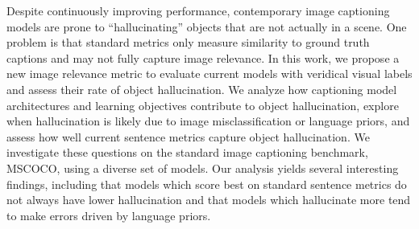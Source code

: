 Despite continuously improving performance, contemporary image captioning models are prone to ``hallucinating'' objects that are not actually in a scene. One problem is that standard metrics only measure similarity to ground truth captions and may not fully capture image relevance. In this work, we propose a new image relevance metric to evaluate current models with veridical visual labels and assess their rate of object hallucination. We analyze how captioning model architectures and learning objectives contribute to object hallucination, explore when hallucination is likely due to image misclassification or language priors, and assess how well current sentence metrics capture object hallucination. We investigate these questions on the standard image captioning benchmark, MSCOCO, using a diverse set of models. Our analysis yields several interesting findings, including that models which score best on standard sentence metrics do not always have lower hallucination and that models which hallucinate more tend to make errors driven by language priors.
